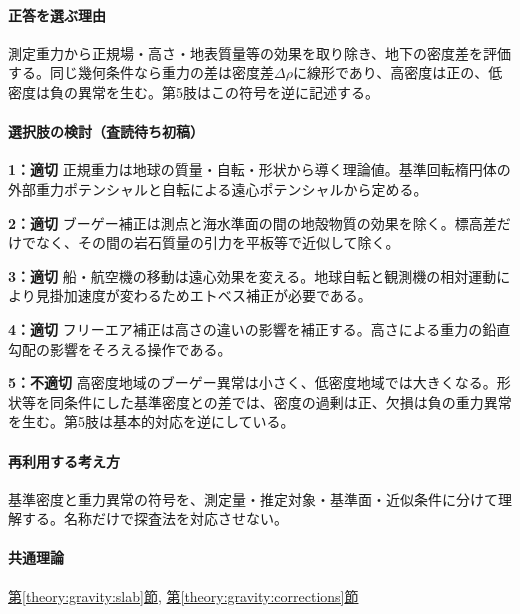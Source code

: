 \paragraph{正答を選ぶ理由} 測定重力から正規場・高さ・地表質量等の効果を取り除き、地下の密度差を評価する。同じ幾何条件なら重力の差は密度差\(\Delta\rho\)に線形であり、高密度は正の、低密度は負の異常を生む。第5肢はこの符号を逆に記述する。

\paragraph{選択肢の検討（査読待ち初稿）}\mbox{}\par

\noindent\textbf{1：適切} 正規重力は地球の質量・自転・形状から導く理論値。基準回転楕円体の外部重力ポテンシャルと自転による遠心ポテンシャルから定める。\par

\noindent\textbf{2：適切} ブーゲー補正は測点と海水準面の間の地殻物質の効果を除く。標高差だけでなく、その間の岩石質量の引力を平板等で近似して除く。\par

\noindent\textbf{3：適切} 船・航空機の移動は遠心効果を変える。地球自転と観測機の相対運動により見掛加速度が変わるためエトベス補正が必要である。\par

\noindent\textbf{4：適切} フリーエア補正は高さの違いの影響を補正する。高さによる重力の鉛直勾配の影響をそろえる操作である。\par

\noindent\textbf{5：不適切} 高密度地域のブーゲー異常は小さく、低密度地域では大きくなる。形状等を同条件にした基準密度との差では、密度の過剰は正、欠損は負の重力異常を生む。第5肢は基本的対応を逆にしている。\par

\paragraph{再利用する考え方} 基準密度と重力異常の符号を、測定量・推定対象・基準面・近似条件に分けて理解する。名称だけで探査法を対応させない。

\paragraph{共通理論} \hyperref[theory:gravity:slab]{第\ref*{theory:gravity:slab}節}, \hyperref[theory:gravity:corrections]{第\ref*{theory:gravity:corrections}節}

